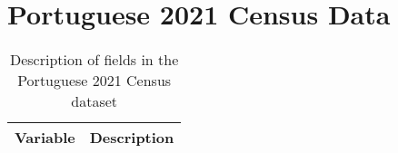 
%
 
\chapter{Portuguese 2021 Census Data}
\label{app:pt_census}

\bgroup
\scriptsize
{}
\begin{xltabular}{\textwidth}{|p{0.4\textwidth}|p{0.6\textwidth}|}
  \caption{Description of fields in the Portuguese 2021 Census dataset}
  \label{tab:field-description}\\
  \hline
  \textbf{Variable} & \textbf{Description} \\
  \hline
  

\end{xltabular}
